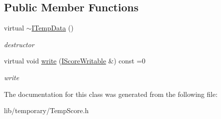 \subsection*{\-Public \-Member \-Functions}
\begin{DoxyCompactItemize}
\item 
\hypertarget{classsinsy_1_1TempScore_1_1ITempData_a84c9771b226d16b5a47b76d7ef0c01d4}{virtual \hyperlink{classsinsy_1_1TempScore_1_1ITempData_a84c9771b226d16b5a47b76d7ef0c01d4}{$\sim$\-I\-Temp\-Data} ()}\label{classsinsy_1_1TempScore_1_1ITempData_a84c9771b226d16b5a47b76d7ef0c01d4}

\begin{DoxyCompactList}\small\item\em destructor \end{DoxyCompactList}\item 
\hypertarget{classsinsy_1_1TempScore_1_1ITempData_ab6d83a865088b42b62dc5a0a82e47fa5}{virtual void \hyperlink{classsinsy_1_1TempScore_1_1ITempData_ab6d83a865088b42b62dc5a0a82e47fa5}{write} (\hyperlink{classsinsy_1_1IScoreWritable}{\-I\-Score\-Writable} \&) const =0}\label{classsinsy_1_1TempScore_1_1ITempData_ab6d83a865088b42b62dc5a0a82e47fa5}

\begin{DoxyCompactList}\small\item\em write \end{DoxyCompactList}\end{DoxyCompactItemize}


\-The documentation for this class was generated from the following file\-:\begin{DoxyCompactItemize}
\item 
lib/temporary/\-Temp\-Score.\-h\end{DoxyCompactItemize}
